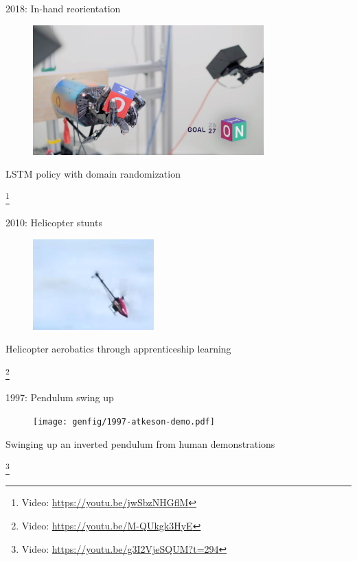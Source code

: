 \documentclass[10pt, aspectratio=1610]{beamer}
\newcommand\blfootnote[1]{%
  \begingroup
  \renewcommand\thefootnote{}%
  \footnote{#1}%
  \addtocounter{footnote}{-1}%
  \endgroup
}
\begin{document}
\begin{frame}{2018: In-hand reorientation}
    \vspace{1.5em}
    \begin{figure}
        \includegraphics[height=5cm]{figures/2018-in-hand-reorientation.jpg}
    \end{figure}
    \begin{center}
        LSTM policy with domain randomization~\cite{andrychowicz2020learning}
    \end{center}
    \blfootnote{Video: \url{https://youtu.be/jwSbzNHGflM}}
\end{frame}

\begin{frame}{2010: Helicopter stunts}
    \vspace{1.5em}
    \begin{figure}
        \includegraphics[height=3.5cm]{figures/2010-helicopter-stunts.jpg}
    \end{figure}
    \begin{center}
        Helicopter aerobatics through apprenticeship learning~\cite{abbeel2010}
    \end{center}
    \blfootnote{Video: \url{https://youtu.be/M-QUkgk3HyE}}
\end{frame}

\begin{frame}{1997: Pendulum swing up}
    \vspace{1.5em}
    \begin{figure}
        \texttt{[image: genfig/1997-atkeson-demo.pdf]}
    \end{figure}
    \begin{center}
        Swinging up an inverted pendulum from human demonstrations~\cite{atkeson1997}
    \end{center}
    \blfootnote{ Video: \url{https://youtu.be/g3I2VjeSQUM?t=294} }
\end{frame}
\end{document}
